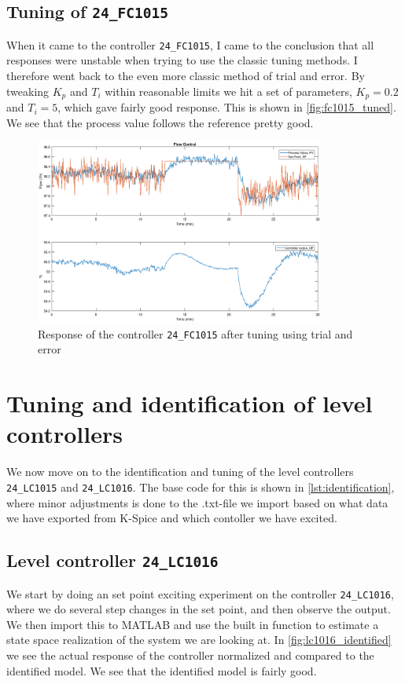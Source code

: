 \subsection{Tuning of \texttt{24\_FC1015}}
When it came to the controller \texttt{24\_FC1015}, I came to the conclusion that all responses were unstable when trying to use the classic tuning methods. I therefore went back to the even more classic method of trial and error. By tweaking $K_p$ and $T_i$ within reasonable limits we hit a set of parameters, $K_p = 0.2$ and $T_i = 5$, which gave fairly good response. This is shown in \autoref{fig:fc1015_tuned}. We see that the process value follows the reference pretty good.

\begin{figure}[ht!]
	\centering
	\includegraphics[width=0.85\textwidth]{fig/tuning/FC1015_tuned.eps}
	\caption{Response of the controller \texttt{24\_FC1015} after tuning using trial and error}
	\label{fig:fc1015_tuned}
\end{figure}

\clearpage
\section{Tuning and identification of level controllers}\label{sec:levelcontrollers}
We now move on to the identification and tuning of the level controllers \texttt{24\_LC1015} and \texttt{24\_LC1016}. The base code for this is shown in \autoref{lst:identification}, where minor adjustments is done to the .txt-file we import based on what data we have exported from K-Spice and which contoller we have excited.

\subsection{Level controller \texttt{24\_LC1016}}
We start by doing an set point exciting experiment on the controller \texttt{24\_LC1016}, where we do several step changes in the set point, and then observe the output. We then import this to MATLAB and use the built in function  to estimate a state space realization of the system we are looking at. In \autoref{fig:lc1016_identified} we see the actual response of the controller  normalized and compared to the identified model. We see that the identified model is fairly good.

